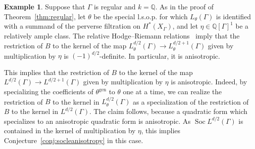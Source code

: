 \documentclass[11pt]{article}
\theoremstyle{definition}
\newtheorem{example}[theo]{Example}
\numberwithin{equation}{section}
\numberwithin{equation}{section}
\begin{document}
\begin{example}
Suppose that $\Gamma$ is regular and $k = \mathbb{Q}$. As in the proof of Theorem~\ref{thm:regular}, let $\theta$ be the special l.s.o.p. for which $L_{\theta}(\Gamma)$ is identified with a summand of the perverse filtration on $H^*(X_{\Gamma})$, and let $\eta \in \mathbb{Q}[\Gamma]^1$ be a relatively ample class. The relative Hodge--Riemann relations~\cite[Theorem 3.3.1(7)]{dCM} imply that the restriction of $B$ to the kernel of the map $L^{d/2}_{\theta}(\Gamma) \to L^{d/2 +1}_{\theta}(\Gamma)$ given by multiplication by $\eta$ is $(-1)^{d/2}$-definite. In particular, it is anisotropic. 

This implies that the restriction of $B$ to the kernel of the map $L^{d/2}(\Gamma) \to L^{d/2 +1}(\Gamma)$ given by multiplication by $\eta$ is anisotropic. Indeed, by specializing the coefficients of $\theta^{\operatorname{gen}}$ to $\theta$ one at a time, we can realize the restriction of $B$ to the kernel in $L^{d/2}_{\theta}(\Gamma)$ as a specialization of the restriction of $B$ to the kernel in $L^{d/2}(\Gamma)$. The claim follows, because a quadratic form which specializes to an anisotropic quadratic form is anisotropic. As $\operatorname{Soc} L^{d/2}(\Gamma)$ is contained in the kernel of multiplication by $\eta$, this implies Conjecture~\ref{conj:socleanisotropy} in this case. 
\end{example}
\end{document}
